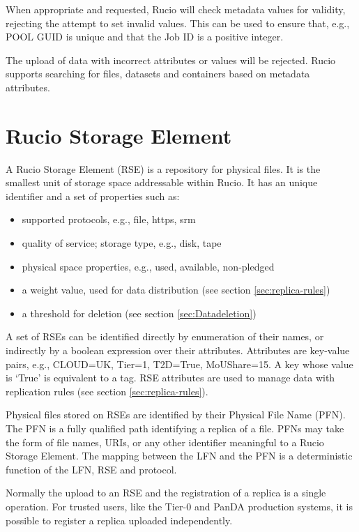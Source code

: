 \documentclass{atlasnote}
\begin{document}
When appropriate and requested, Rucio will check metadata values for validity, rejecting the attempt to set invalid values. This can be used to ensure that, e.g., POOL GUID is unique and that the Job ID is a positive integer.

The upload of data with incorrect attributes or values will be rejected. Rucio supports searching for files, datasets and containers based on metadata attributes.

\section{Rucio Storage Element}
\label{overview_Rucio_Storage_Element:rucio-storage-element}

A Rucio Storage Element (RSE) is a repository for physical files. It is the smallest unit of storage space addressable within Rucio. It has an unique identifier and a set of properties such as:

\begin{itemize}
\item supported protocols, e.g., file, https, srm
\item quality of service; storage type, e.g., disk, tape
\item physical space properties, e.g., used, available, non-pledged
\item a weight value, used for data distribution (see section \ref{sec:replica-rules})
\item a threshold for deletion (see section \ref{sec:Datadeletion})
\end{itemize}

\noindent A set of RSEs can be identified directly by enumeration of their names, or indirectly by a boolean expression over their attributes. Attributes are key-value pairs, e.g., CLOUD=UK, Tier=1, T2D=True, MoUShare=15. A key whose value is ‘True’ is equivalent to a tag. RSE attributes are used to manage data with replication rules (see section \ref{sec:replica-rules}).

Physical files stored on RSEs are identified by their Physical File Name (PFN). The PFN is a fully qualified path identifying a replica of a file. PFNs may take the form of file names, URIs, or any other identifier meaningful to a Rucio Storage Element. The mapping between the LFN and the PFN is a deterministic function of the LFN, RSE and protocol.

Normally the upload to an RSE and the registration of a replica is a single operation. For trusted users, like the Tier-0 and PanDA production systems, it is possible to register a replica uploaded independently.
\end{document}
